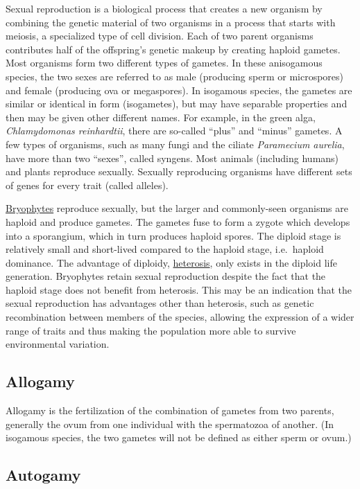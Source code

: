 Sexual reproduction is a biological process that creates a new organism by combining the genetic material of two organisms in a process that starts with meiosis, a specialized type of cell division. Each of two parent organisms contributes half of the offspring's genetic makeup by creating haploid gametes. Most organisms form two different types of gametes. In these anisogamous species, the two sexes are referred to as male (producing sperm or microspores) and female (producing ova or megaspores). In isogamous species, the gametes are similar or identical in form (isogametes), but may have separable properties and then may be given other different names. For example, in the green alga, \emph{Chlamydomonas reinhardtii}, there are so-called ``plus'' and ``minus'' gametes. A few types of organisms, such as many fungi and the ciliate \emph{Paramecium aurelia}, have more than two ``sexes'', called syngens. Most animals (including humans) and plants reproduce sexually. Sexually reproducing organisms have different sets of genes for every trait (called alleles).

\href{https://en.wikipedia.org/wiki/Bryophyte}{Bryophytes} reproduce sexually, but the larger and commonly-seen organisms are haploid and produce gametes. The gametes fuse to form a zygote which develops into a sporangium, which in turn produces haploid spores. The diploid stage is relatively small and short-lived compared to the haploid stage, i.e.~haploid dominance. The advantage of diploidy, \href{https://en.wikipedia.org/wiki/Heterosis}{heterosis}, only exists in the diploid life generation. Bryophytes retain sexual reproduction despite the fact that the haploid stage does not benefit from heterosis. This may be an indication that the sexual reproduction has advantages other than heterosis, such as genetic recombination between members of the species, allowing the expression of a wider range of traits and thus making the population more able to survive environmental variation.

\hypertarget{allogamy}{%
\subsection{Allogamy}\label{allogamy}}

Allogamy is the fertilization of the combination of gametes from two parents, generally the ovum from one individual with the spermatozoa of another. (In isogamous species, the two gametes will not be defined as either sperm or ovum.)

\hypertarget{autogamy}{%
\subsection{Autogamy}\label{autogamy}}

